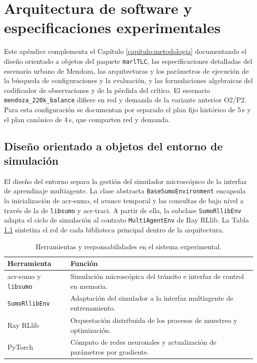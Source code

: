 \chapter{Arquitectura de software y especificaciones experimentales}
\label{apendice:arquitectura_software}

Este apéndice complementa el Capítulo \ref{capitulo:metodologia} documentando el diseño orientado a objetos del paquete \texttt{marlTLC}, las especificaciones detalladas del escenario urbano de Mendoza, las arquitecturas y los parámetros de ejecución de la búsqueda de configuraciones y la evaluación, y las formulaciones algebraicas del codificador de observaciones y de la pérdida del crítico. El escenario \texttt{mendoza\_220k\_balance} difiere en red y demanda de la variante anterior O2/P2. Para esta configuración se documentan por separado el plan fijo histórico de 5\,s y el plan canónico de 4\,s, que comparten red y demanda.

\section{Diseño orientado a objetos del entorno de simulación}
\label{sec:apendice_uml_entorno}

El diseño del \gls{entorno} separa la gestión del simulador microscópico de la interfaz de aprendizaje multiagente. La clase abstracta \texttt{BaseSumoEnvironment} encapsula la inicialización de \acrshort{acr-sumo}, el avance temporal y las consultas de bajo nivel a través de la  de \texttt{libsumo} y \acrshort{acr-traci}. A partir de ella, la subclase \texttt{SumoRllibEnv} adapta el ciclo de simulación al contrato \texttt{MultiAgentEnv} de Ray RLlib. La Tabla \ref{tab:stack_tecnologico} sintetiza el rol de cada biblioteca principal dentro de la arquitectura.

\begin{table}[H]\centering\small
\caption{Herramientas y responsabilidades en el sistema experimental.}
\label{tab:stack_tecnologico}
\begin{tabular}{>{\raggedright\arraybackslash}p{3.6cm}>{\raggedright\arraybackslash}p{9.9cm}}\hline
Herramienta & Función \\\hline
\acrshort{acr-sumo} y \texttt{libsumo} & Simulación microscópica del tránsito e interfaz de control en memoria. \\
\texttt{SumoRllibEnv} & Adaptación del simulador a la interfaz multiagente de entrenamiento. \\
Ray RLlib & Orquestación distribuida de los procesos de muestreo y optimización. \\
PyTorch & Cómputo de redes neuronales y actualización de parámetros por gradiente. \\\hline
\end{tabular}\end{table}

